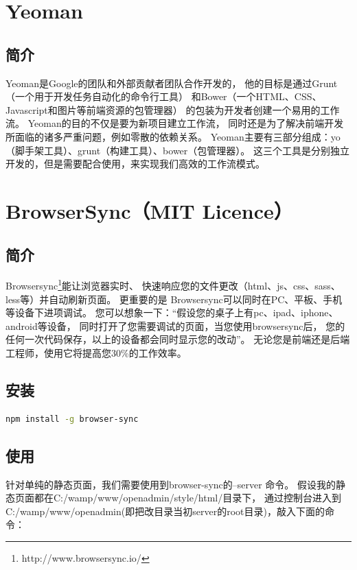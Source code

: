 \documentclass{book}
\begin{document}
\section{Yeoman}

\subsection{简介}

Yeoman是Google的团队和外部贡献者团队合作开发的，
他的目标是通过Grunt（一个用于开发任务自动化的命令行工具）
和Bower（一个HTML、CSS、Javascript和图片等前端资源的包管理器）
的包装为开发者创建一个易用的工作流。
Yeoman的目的不仅是要为新项目建立工作流，
同时还是为了解决前端开发所面临的诸多严重问题，例如零散的依赖关系。
Yeoman主要有三部分组成：yo（脚手架工具）、grunt（构建工具）、bower（包管理器）。
这三个工具是分别独立开发的，但是需要配合使用，来实现我们高效的工作流模式。 

\section{BrowserSync（MIT Licence）}

\subsection{简介}

Browsersync\footnote{http://www.browsersync.io/}能让浏览器实时、
快速响应您的文件更改（html、js、css、sass、less等）并自动刷新页面。
更重要的是 Browsersync可以同时在PC、平板、手机等设备下进项调试。
您可以想象一下：“假设您的桌子上有pc、ipad、iphone、android等设备，
同时打开了您需要调试的页面，当您使用browsersync后，
您的任何一次代码保存，以上的设备都会同时显示您的改动”。
无论您是前端还是后端工程师，使用它将提高您30\%的工作效率。 

\subsection{安装}

\begin{lstlisting}[language=bash]
npm install -g browser-sync
\end{lstlisting}

\subsection{使用}

针对单纯的静态页面，我们需要使用到browser-sync的--server 命令。
假设我的静态页面都在C:/wamp/www/openadmin/style/html/目录下，
通过控制台进入到C:/wamp/www/openadmin(即把改目录当初server的root目录)，敲入下面的命令：
\end{document}
